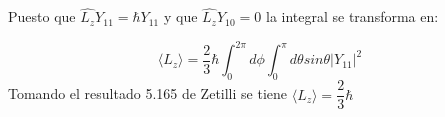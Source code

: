 \begin{solution}
\begin{parts}
Puesto que $\hat{L_z}Y_{11}=\hbar Y_{11}$ y que $\hat{L_z}Y_{10}=0$ la integral se transforma en:

\begin{equation*}
    \langle L_z \rangle = \dfrac{2}{3}\hbar \int_{0}^{2\pi} d\phi \int_{0}^{\pi} d\theta sin \theta |Y_{11}|^2
\end{equation*}
	Tomando el resultado 5.165 de Zetilli se tiene $\langle L_z \rangle=\dfrac{2}{3}\hbar$
\end{parts}
\end{solution}








 
